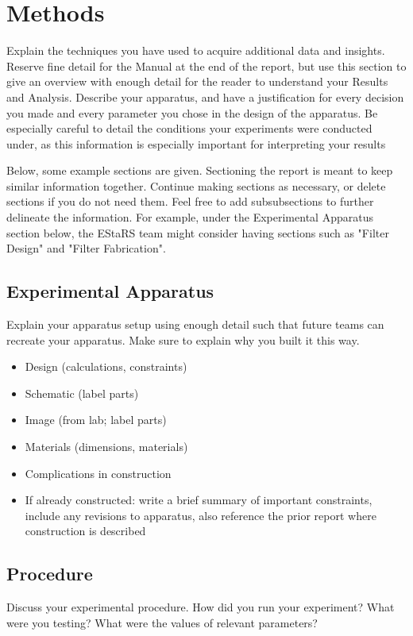 \documentclass[a4paper]{article}
\begin{document}
\section*{Methods}
Explain the techniques you have used to acquire additional data and insights. Reserve fine detail for the Manual at the end of the report, but use this section to give an overview with enough detail for the reader to understand your Results and Analysis. Describe your apparatus, and have a justification for every decision you made and every parameter you chose in the design of the apparatus. Be especially careful to detail the conditions your experiments were conducted under, as this information is especially important for interpreting your results

Below, some example sections are given. Sectioning the report is meant to keep similar information together.  Continue making sections as necessary, or delete sections if you do not need them. Feel free to add subsubsections to further delineate the information. For example, under the Experimental Apparatus section below, the EStaRS team might consider having sections such as "Filter Design" and "Filter Fabrication".

\subsection*{Experimental Apparatus}
Explain your apparatus setup using enough detail such that future teams can recreate your apparatus. Make sure to explain why you built it this way. 
\begin{itemize}
\item Design (calculations, constraints)
\item Schematic (label parts)
\item Image (from lab; label parts)
\item Materials (dimensions, materials)
\item Complications in construction
\item If already constructed: write a brief summary of important constraints, include any revisions to apparatus, also reference the prior report where construction is described
\end{itemize}

\subsection*{Procedure }
Discuss your experimental procedure. How did you run your experiment? What were you testing? What were the values of relevant parameters?
\end{document}
